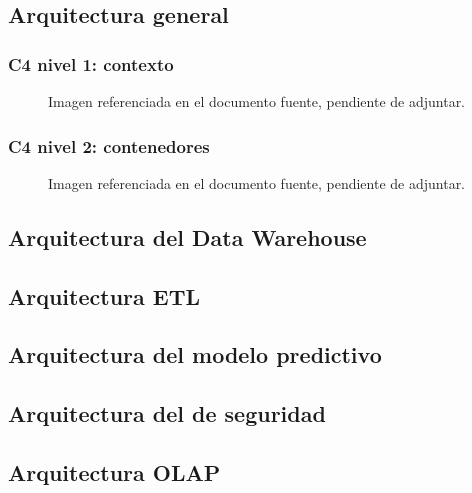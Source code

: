 \documentclass[11pt,oneside,openany]{book}
\begin{document}
\subsection{Arquitectura general}

\subsubsection{C4 nivel 1: contexto}

\begin{figure}[htbp]\centering
{}
\caption*{Imagen referenciada en el documento fuente, pendiente de adjuntar.}
\end{figure}

\subsubsection{C4 nivel 2: contenedores}

\begin{figure}[htbp]\centering
{}
\caption*{Imagen referenciada en el documento fuente, pendiente de adjuntar.}
\end{figure}

\subsection{Arquitectura del Data Warehouse}

\subsection{Arquitectura ETL}

\subsection{Arquitectura del modelo predictivo}

\subsection{Arquitectura del de seguridad}

\subsection{Arquitectura OLAP}
\end{document}
